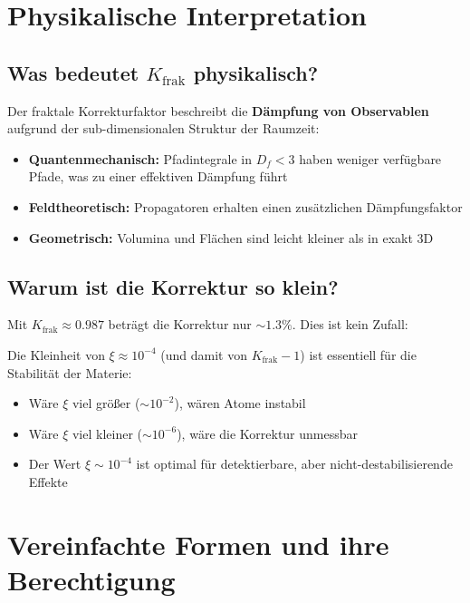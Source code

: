 	\section{Physikalische Interpretation}
	
	\subsection{Was bedeutet $K_{\text{frak}}$ physikalisch?}
	
	Der fraktale Korrekturfaktor beschreibt die \textbf{Dämpfung von Observablen} aufgrund der sub-dimensionalen Struktur der Raumzeit:
	
	\begin{itemize}
		\item \textbf{Quantenmechanisch:} Pfadintegrale in $D_f < 3$ haben weniger verfügbare Pfade, was zu einer effektiven Dämpfung führt
		\item \textbf{Feldtheoretisch:} Propagatoren erhalten einen zusätzlichen Dämpfungsfaktor
		\item \textbf{Geometrisch:} Volumina und Flächen sind leicht kleiner als in exakt 3D
	\end{itemize}
	
	\subsection{Warum ist die Korrektur so klein?}
	
	Mit $K_{\text{frak}} \approx 0.987$ beträgt die Korrektur nur $\sim 1.3\%$. Dies ist kein Zufall:
	
	\begin{tcolorbox}[colback=blue!5!white,colframe=blue!75!black,title={Feinabstimmung der Natur}]
		Die Kleinheit von $\xi \approx 10^{-4}$ (und damit von $K_{\text{frak}} - 1$) ist essentiell für die Stabilität der Materie:
		
		\begin{itemize}
			\item Wäre $\xi$ viel größer ($\sim 10^{-2}$), wären Atome instabil
			\item Wäre $\xi$ viel kleiner ($\sim 10^{-6}$), wäre die Korrektur unmessbar
			\item Der Wert $\xi \sim 10^{-4}$ ist optimal für detektierbare, aber nicht-destabilisierende Effekte
		\end{itemize}
	\end{tcolorbox}
	
	\section{Vereinfachte Formen und ihre Berechtigung}
	
